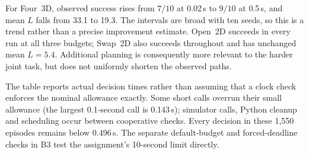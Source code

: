 For Four~3D, observed success rises from $7/10$ at 0.02\,s to $9/10$ at
0.5\,s, and mean $L$ falls from 33.1 to 19.3. The intervals are broad with
ten seeds, so this is a trend rather than a precise improvement estimate.
Open~2D succeeds in every run at all three budgets; Swap~2D also succeeds
throughout and has unchanged mean $L=5.4$. Additional planning is consequently
more relevant to the harder joint task, but does not uniformly shorten the
observed paths.

The table reports actual decision times rather than assuming that a clock
check enforces the nominal allowance exactly. Some short calls overrun their
small allowance (the largest 0.1-second call is 0.143\,s); simulator calls,
Python cleanup and scheduling occur between cooperative checks. Every
decision in these 1,550 episodes remains below 0.496\,s. The separate
default-budget and forced-deadline checks in B3 test the assignment's
10-second limit directly.
